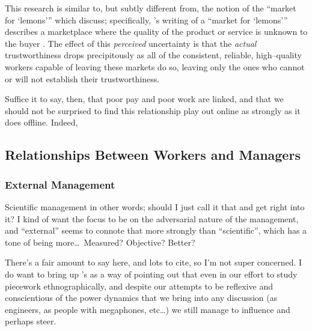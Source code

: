 \documentclass{sigchi}
\begin{document}
This research is similar to, but subtly different from, the notion of the ``market for `lemons'''
which \citeauthor{fort2011amazon} discuss;
specifically, \citeauthor{akerlof1970market}'s writing of a ``market for `lemons'''
describes a marketplace where the quality of the product or service is unknown to the buyer
\cite{fort2011amazon,akerlof1970market}.
The effect of this \textit{perceived} uncertainty is that
the \textit{actual} trustworthiness drops precipitously
as all of the consistent, reliable, high--quality workers capable of leaving these markets do so,
leaving only the ones who cannot or will not establish their trustworthiness.

Suffice it to say, then, that poor pay and poor work are linked,
and that we should not be surprised to find this relationship play out online as strongly as it does offline.
Indeed, 





\subsection{Relationships Between Workers and Managers}\label{sec:relationships}


\subsubsection{External Management}
\itshape

Scientific management in other words; should I just call it that and get right into it?
I kind of want the focus to be on the adversarial nature of the management,
and ``external'' seems to connote that more strongly than ``scientific'',
which has a tone of being more\dots~Measured? Objective? Better?

There's a fair amount to say here, and lots to cite, so I'm not super concerned.
I do want to bring up \citeauthor{storiesIraniSilberman}'s
 \cite{storiesIraniSilberman}
as a way of pointing out that even in our effort to study piecework ethnographically,
and despite our attempts to be reflexive and conscientious of
the power dynamics that we bring into any discussion
(as engineers, as people with megaphones, etc\dots)
we still manage to influence and perhaps steer.

\upshape

\end{document}
